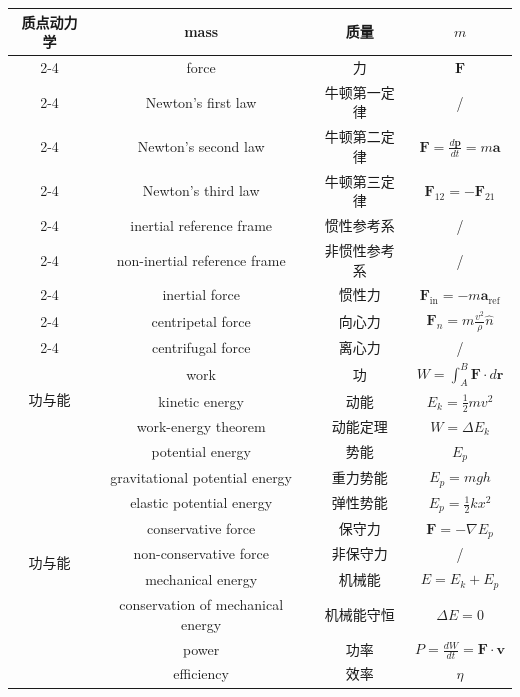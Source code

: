 \documentclass{article}
\begin{document}
\begin{longtable}{|c|c|c|c|}
  \multirow{10}{*}{质点动力学}
  & mass & 质量 & $m$ \\
  \cline{2-4}
  & force & 力 & $\boldsymbol{F}$ \\
  \cline{2-4}
  & Newton's first law & 牛顿第一定律 & / \\
  \cline{2-4}
  & Newton's second law & 牛顿第二定律 & $\boldsymbol{F}=\frac{d\boldsymbol{p}}{dt}=m\boldsymbol{a}$ \\
  \cline{2-4}
  & Newton's third law & 牛顿第三定律 & $\boldsymbol{F}_{12}=-\boldsymbol{F}_{21}$ \\
  \cline{2-4}
  & inertial reference frame & 惯性参考系 & / \\
  \cline{2-4}
  & non-inertial reference frame & 非惯性参考系 & / \\
  \cline{2-4}
  & inertial force & 惯性力 & $\boldsymbol{F}_{\text{in}}=-m\boldsymbol{a}_{\text{ref}}$ \\
  \cline{2-4}
  & centripetal force & 向心力 & $\boldsymbol{F}_n=m\frac{v^2}{\rho}\hat{n}$ \\
  \cline{2-4}
  & centrifugal force & 离心力 & / \\
  \hline

  \multirow{3}{*}{功与能}
  & work & 功 & $W=\int_{A}^{B}\boldsymbol{F}\cdot d\boldsymbol{r}$ \\
  \cline{2-4}
  & kinetic energy & 动能 & $E_k=\frac{1}{2}mv^2$ \\
  \cline{2-4}
  & work-energy theorem & 动能定理 & $W=\Delta E_k$ \\
  \hline
  \multirow{9}{*}{功与能}
  & potential energy & 势能 & $E_p$ \\
  \cline{2-4}
  & gravitational potential energy & 重力势能 & $E_p=mgh$ \\
  \cline{2-4}
  & elastic potential energy & 弹性势能 & $E_p=\frac{1}{2}kx^2$ \\
  \cline{2-4}
  & conservative force & 保守力 & $\boldsymbol{F}=-\nabla E_p$ \\
  \cline{2-4}
  & non-conservative force & 非保守力 & / \\
  \cline{2-4}
  & mechanical energy & 机械能 & $E=E_k+E_p$ \\
  \cline{2-4}
  & conservation of mechanical energy & 机械能守恒 & $\Delta E=0$ \\
  \cline{2-4}
  & power & 功率 & $P=\frac{dW}{dt}=\boldsymbol{F}\cdot\boldsymbol{v}$ \\
  \cline{2-4}
  & efficiency & 效率 & $\eta$ \\
  \hline


\end{longtable}
\end{document}
